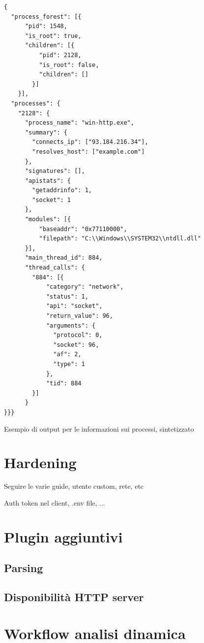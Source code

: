 \newpage
\begin{code}
\begin{verbatim}
{
  "process_forest": [{
      "pid": 1548,
      "is_root": true,
      "children": [{
          "pid": 2128,
          "is_root": false,
          "children": []
        }]
    }],
  "processes": {
    "2128": {
      "process_name": "win-http.exe",
      "summary": {
        "connects_ip": ["93.184.216.34"],
        "resolves_host": ["example.com"]
      },
      "signatures": [],
      "apistats": {
        "getaddrinfo": 1,
        "socket": 1
      },
      "modules": [{
          "baseaddr": "0x77110000",
          "filepath": "C:\\Windows\\SYSTEM32\\ntdll.dll"
      }],
      "main_thread_id": 884,
      "thread_calls": {
        "884": [{
            "category": "network",
            "status": 1,
            "api": "socket",
            "return_value": 96,
            "arguments": {
              "protocol": 0,
              "socket": 96,
              "af": 2,
              "type": 1
            },
            "tid": 884
        }]
      }
}}}
\end{verbatim}
\caption{Esempio di output per le informazioni sui processi, sintetizzato}
\end{code}

\section{Hardening}
\label{chap:dynamic-vm-hardening}
Seguire le varie guide, utente custom, rete, etc

Auth token nel client, .env file, ...

\section{Plugin aggiuntivi}
\subsection{Parsing}
\subsection{Disponibilità HTTP server}

\section{Workflow analisi dinamica}
